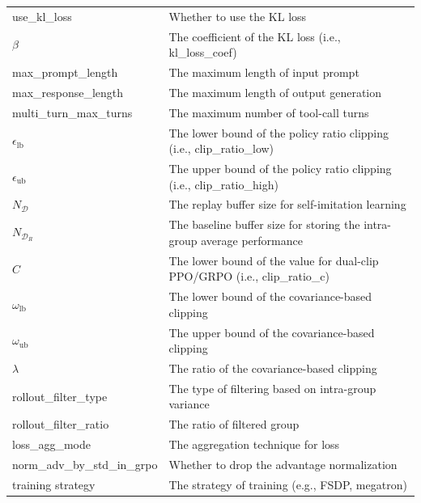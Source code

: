 \documentclass[]{youtu} %
\begin{document}
\begin{table}[htbp]
{{{\begin{tabular}{ll}
use\_kl\_loss & Whether to use the KL loss \\
$\beta$ &  The coefficient of the KL loss (i.e., kl\_loss\_coef) \\
max\_prompt\_length &  The maximum length of input prompt \\
max\_response\_length &  The maximum length of output generation \\
multi\_turn\_max\_turns & The maximum number of tool-call turns \\
$\epsilon_{\text{lb}}$  &  The lower bound of the policy ratio clipping (i.e., clip\_ratio\_low) \\
$\epsilon_{\text{ub}}$ & The upper bound of the policy ratio clipping (i.e., clip\_ratio\_high) \\
$N_{\mathcal{D}}$ & The replay buffer size for self-imitation learning \\
$N_{\mathcal{D}_R}$ & The baseline buffer size for storing the intra-group average performance \\
$C$ & The lower bound of the value for dual-clip PPO/GRPO (i.e., clip\_ratio\_c) \\
$\omega_{\text{lb}}$  & The lower bound of the covariance-based clipping \\
$\omega_{\text{ub}}$ & The upper bound of the covariance-based clipping \\
$\lambda$ & The ratio of the covariance-based clipping \\
rollout\_filter\_type & The type of filtering based on intra-group variance\\
rollout\_filter\_ratio & The ratio of filtered group \\
loss\_agg\_mode  & The aggregation technique for loss \\
norm\_adv\_by\_std\_in\_grpo & Whether to drop the advantage normalization  \\
training strategy  &  The strategy of training (e.g., FSDP, megatron) \\
\bottomrule
\end{tabular}
}}}
\end{table}
\end{document}
